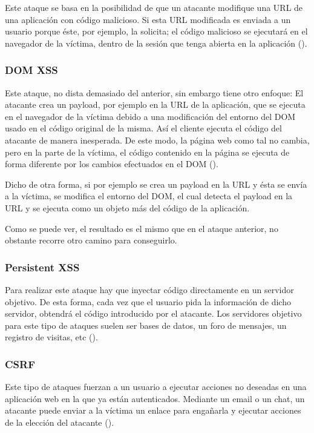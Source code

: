 Este ataque se basa en la posibilidad de que un atacante modifique una URL de una aplicación con código malicioso. Si esta URL modificada es enviada a un usuario porque éste, por ejemplo, la solicita; el código malicioso se ejecutará en el navegador de la víctima, dentro de la sesión que tenga abierta en la aplicación (\cite{reflected-xss}). %

\subsubsection{DOM XSS}

Este ataque, no dista demasiado del anterior, sin embargo tiene otro enfoque: El atacante crea un payload, por ejemplo en la URL de la aplicación, que se ejecuta en el navegador de la víctima debido a una modificación del entorno del DOM usado en el código original de la misma. Así el cliente ejecuta el código del atacante de manera inesperada. De este modo, la página web como tal no cambia, pero en la parte de la víctima, el código contenido en la página se ejecuta de forma diferente por los cambios efectuados en el DOM (\cite{dom-xss}).

Dicho de otra forma, si por ejemplo se crea un payload en la URL y ésta se envía a la víctima, se modifica el entorno del DOM, el cual detecta el payload en la URL y se ejecuta como un objeto más del código de la aplicación.

Como se puede ver, el resultado es el mismo que en el ataque anterior, no obstante recorre otro camino para conseguirlo. %

\subsubsection{Persistent XSS}

Para realizar este ataque hay que inyectar código directamente en un servidor objetivo. De esta forma, cada vez que el usuario pida la información de dicho servidor, obtendrá el código introducido por el atacante. Los servidores objetivo para este tipo de ataques suelen ser bases de datos, un foro de mensajes, un registro de visitas, etc (\cite{persistent-xss}). %

\subsubsection{CSRF}

Este tipo de ataques fuerzan a un usuario a ejecutar acciones no deseadas en una aplicación web en la que ya están autenticados. Mediante un email o un chat, un atacante puede enviar a la víctima un enlace para engañarla y ejecutar acciones de la elección del atacante (\cite{csrf}). %


